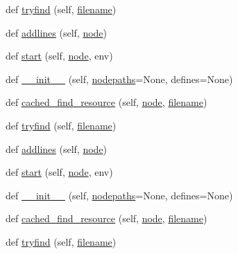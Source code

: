 \begin{DoxyCompactItemize}
\item 
def \hyperlink{classwaflib_1_1_tools_1_1c__preproc_1_1c__parser_a7cbdc05f2fac61f5b962f558d18bf7ab}{tryfind} (self, \hyperlink{test__portburn_8cpp_a7efa5e9c7494c7d4586359300221aa5d}{filename})
\item 
def \hyperlink{classwaflib_1_1_tools_1_1c__preproc_1_1c__parser_a9a0cb675b91f0ce6d65109e1b67bcc69}{addlines} (self, \hyperlink{structnode}{node})
\item 
def \hyperlink{classwaflib_1_1_tools_1_1c__preproc_1_1c__parser_ada08ffe0c9d9fcf8d55b3e35927511e6}{start} (self, \hyperlink{structnode}{node}, env)
\item 
def \hyperlink{classwaflib_1_1_tools_1_1c__preproc_1_1c__parser_aa06a68f192a6f93ba1587fa653d57eaa}{\+\_\+\+\_\+init\+\_\+\+\_\+} (self, \hyperlink{classwaflib_1_1_tools_1_1c__preproc_1_1c__parser_a175b9d997a489166cdfbff084ded4adf}{nodepaths}=None, defines=None)
\item 
def \hyperlink{classwaflib_1_1_tools_1_1c__preproc_1_1c__parser_a05773b7fed7398fc94fb3393dca8b641}{cached\+\_\+find\+\_\+resource} (self, \hyperlink{structnode}{node}, \hyperlink{test__portburn_8cpp_a7efa5e9c7494c7d4586359300221aa5d}{filename})
\item 
def \hyperlink{classwaflib_1_1_tools_1_1c__preproc_1_1c__parser_a7cbdc05f2fac61f5b962f558d18bf7ab}{tryfind} (self, \hyperlink{test__portburn_8cpp_a7efa5e9c7494c7d4586359300221aa5d}{filename})
\item 
def \hyperlink{classwaflib_1_1_tools_1_1c__preproc_1_1c__parser_a9a0cb675b91f0ce6d65109e1b67bcc69}{addlines} (self, \hyperlink{structnode}{node})
\item 
def \hyperlink{classwaflib_1_1_tools_1_1c__preproc_1_1c__parser_ada08ffe0c9d9fcf8d55b3e35927511e6}{start} (self, \hyperlink{structnode}{node}, env)
\item 
def \hyperlink{classwaflib_1_1_tools_1_1c__preproc_1_1c__parser_aa06a68f192a6f93ba1587fa653d57eaa}{\+\_\+\+\_\+init\+\_\+\+\_\+} (self, \hyperlink{classwaflib_1_1_tools_1_1c__preproc_1_1c__parser_a175b9d997a489166cdfbff084ded4adf}{nodepaths}=None, defines=None)
\item 
def \hyperlink{classwaflib_1_1_tools_1_1c__preproc_1_1c__parser_a05773b7fed7398fc94fb3393dca8b641}{cached\+\_\+find\+\_\+resource} (self, \hyperlink{structnode}{node}, \hyperlink{test__portburn_8cpp_a7efa5e9c7494c7d4586359300221aa5d}{filename})
\item 
def \hyperlink{classwaflib_1_1_tools_1_1c__preproc_1_1c__parser_a7cbdc05f2fac61f5b962f558d18bf7ab}{tryfind} (self, \hyperlink{test__portburn_8cpp_a7efa5e9c7494c7d4586359300221aa5d}{filename})

\end{DoxyCompactItemize}
